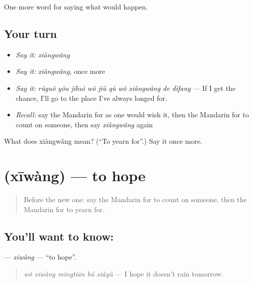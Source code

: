\begin{grammarlens}[title={What you've built}]
One more word for saying what would happen.
\end{grammarlens}

\subsection*{Your turn}
\begin{itemize}
\raggedright
  \item \emph{Say it:} \emph{xiàngwǎng}
  \item \emph{Say it:} \emph{xiàngwǎng}, once more
  \item \emph{Say it:} \emph{rúguǒ yǒu jīhuì wǒ jiù qù wǒ xiàngwǎng de dìfang} — If I get the chance, I'll go to the place I've always longed for.
  \item \emph{Recall:} say the Mandarin for as one would wish it, then the Mandarin for to count on someone, then say \emph{xiàngwǎng} again
\end{itemize}

\begin{tcolorbox}[breakable,colback=teal!4,colframe=teal!35!black,title={Before you move on}]
What does xiàngwǎng mean? (\textquotedblleft{}To yearn for\textquotedblright{}.) Say it once more.
\end{tcolorbox}
\section[\texorpdfstring{\zh{希望} (xīwàng)}{希望 (xīwàng)}]{ (xīwàng) — to hope}

\label{lesson:ZH-C533-xiwang}



\begin{quote}
Before the new one: say the Mandarin for to count on someone, then the Mandarin for to yearn for.
\end{quote}

\subsection*{You'll want to know: }
\textbf{} — \emph{xīwàng} — \textquotedblleft{}to hope\textquotedblright{}.

\begin{quote}
\textbf{} \emph{wǒ xīwàng míngtiān bú xiàyǔ} — I hope it doesn't rain tomorrow.
\end{quote}

